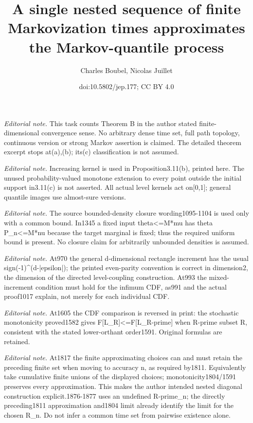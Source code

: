 \documentclass[10pt,a4paper]{article}
\title{A single nested sequence of finite Markovization times approximates the Markov-quantile process}
\author{Charles Boubel, Nicolas Juillet}
\date{doi:10.5802/jep.177; CC BY 4.0}
\theoremstyle{plain}
\theoremstyle{definition}
\begin{document}
\maketitle
\noindent\textit{Editorial note.} This task counts Theorem B in the author stated finite-dimensional convergence sense. No arbitrary dense time set, full path topology, continuous version or strong Markov assertion is claimed. The detailed theorem excerpt stops at(a),(b); its(c) classification is not assumed.\par\medskip
\noindent\textit{Editorial note.} Increasing kernel is used in Proposition3.11(b), printed here. The unused probability-valued monotone extension to every point outside the initial support in3.11(c) is not asserted. All actual level kernels act on[0,1]; general quantile images use almost-sure versions.\par\medskip
\noindent\textit{Editorial note.} The source bounded-density closure wording1095-1104 is used only with a common bound. In1345 a fixed input theta<=M*mu has theta P\_n<=M*nu because the target marginal is fixed; thus the required uniform bound is present. No closure claim for arbitrarily unbounded densities is assumed.\par\medskip
\noindent\textit{Editorial note.} At970 the general d-dimensional rectangle increment has the usual sign(-1)\textasciicircum{}(d-|epsilon|); the printed even-parity convention is correct in dimension2, the dimension of the directed level-coupling construction. At993 the mixed-increment condition must hold for the infimum CDF, as991 and the actual proof1017 explain, not merely for each individual CDF.\par\medskip
\noindent\textit{Editorial note.} At1605 the CDF comparison is reversed in print: the stochastic monotonicity proved1582 gives F[L\_R]<=F[L\_R-prime] when R-prime subset R, consistent with the stated lower-orthant order1591. Original formulas are retained.\par\medskip
\noindent\textit{Editorial note.} At1817 the finite approximating choices can and must retain the preceding finite set when moving to accuracy n, as required by1811. Equivalently take cumulative finite unions of the displayed choices; monotonicity1804/1591 preserves every approximation. This makes the author intended nested diagonal construction explicit.1876-1877 uses an undefined R-prime\_n; the directly preceding1811 approximation and1804 limit already identify the limit for the chosen R\_n. Do not infer a common time set from pairwise existence alone.\par\medskip
\end{document}
